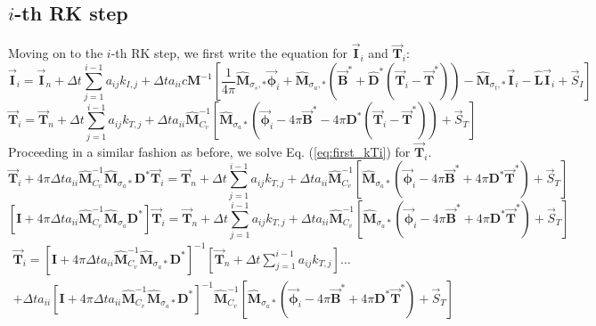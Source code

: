 \documentclass[11pt]{article}
\newcommand{\benum}{\begin{equation}}
\newcommand{\eenum}{\end{equation}}
\newcommand{\be}{\begin{equation*}}
\newcommand{\ee}{\end{equation*}}
\newcommand{\eqt}[1]{Eq. (\ref{#1})}
\newcommand{\vect}[1]{\ensuremath{ \vec{\mathbf #1}}}
\newcommand{\Mw}{\ensuremath{\widehat{\mathbf M}}}
\begin{document}
\subsection{$i$-th RK step}
Moving on to the $i$-th RK step, we first write the equation for $\vect{I}_i$ and $\vect{T}_{i}$:
\benum
\vect{I}_i = \vect{I}_n + \Delta t \sum_{j=1}^{i-1}{a_{ij} k_{I,j}   } + \Delta t a_{ii} c \mathbf{M}^{-1}\left[
\frac{1}{4\pi}\widehat{ \mathbf M}_{\sigma_s,*}\vect{\phi}_i +
\Mw_{\sigma_a,*}\left(\vect{B}^* + \widehat{\mathbf D}^*\left(\vect{T}_i -\vect{T}^*  \right)   \right)- \widehat{\mathbf M}_{\sigma_t,*} \vect{I}_i - \widehat{ \mathbf L}\vect{I}_i + \vec{S}_I
\right]
\label{eq:first_kIi}
\eenum
\benum
\vect{T}_i = \vect{T}_n + \Delta t \sum_{j=1}^{i-1}{a_{ij} k_{T,j}   } + \Delta t a_{ii}\Mw_{C_v}^{-1}\left[
\Mw_{\sigma_a*}\left(\vect{\phi}_i - 4\pi\vect{B}^* - 4\pi\mathbf{D}^*\left( \vect{T}_i - \vect{T}^* \right)\right) + \vec{S}_T 
\right]
\label{eq:first_kTi}
\eenum
%
%
Proceeding in a similar fashion as before, we solve \eqt{eq:first_kTi} for $\vect{T}_{i}$.
%
%
\be
\vect{T}_i +4\pi\Delta t a_{ii}\Mw_{C_v}^{-1}\Mw_{\sigma_a*}\mathbf{D}^*\vect{T}_i = \vect{T}_n + \Delta t \sum_{j=1}^{i-1}{a_{ij} k_{T,j}   } + \Delta t a_{ii}
\Mw_{C_v}^{-1}\left[
\Mw_{\sigma_a*} \left(\vect{\phi}_i - 4\pi\vect{B}^* + 4\pi\mathbf{D}^*\vect{T}^* \right) + \vec{S}_T
 \right]
\ee
%
%
\be
\left[\mathbf{I} + 4\pi\Delta t a_{ii}\Mw_{C_v}^{-1}\Mw_{\sigma_a}\mathbf{D}^*  \right]\vect{T}_i = \vect{T}_n + \Delta t \sum_{j=1}^{i-1}{a_{ij} k_{T,j}   } + \Delta t a_{ii}\Mw_{C_v}^{-1}\left[\Mw_{\sigma_a*} \left(\vect{\phi}_i - 4\pi\vect{B}^* + 4\pi\mathbf{D}^*\vect{T}^* \right) + \vec{S}_T \right]
\ee
%
%
%
\begin{multline*}
\vect{T}_i = \left[\mathbf{I} + 4\pi\Delta t a_{ii}\Mw_{C_v}^{-1}\Mw_{\sigma_a*}\mathbf{D}^*  \right]^{-1}\left[\vect{T}_n + \Delta t \sum_{j=1}^{i-1}{a_{ij} k_{T,j}   }\right] \dots \\
+ \Delta t a_{ii}\left[\mathbf{I} +  4\pi\Delta t a_{ii}\Mw_{C_v}^{-1}\Mw_{\sigma_a*}\mathbf{D}^*  \right]^{-1}\Mw_{C_v}^{-1}\left[
\Mw_{\sigma_a*} \left(\vect{\phi}_i - 4\pi\vect{B}^* + 4\pi\mathbf{D}^*\vect{T}^* \right) + \vec{S}_T 
\right] 
\end{multline*}
%
%
%
\end{document}
